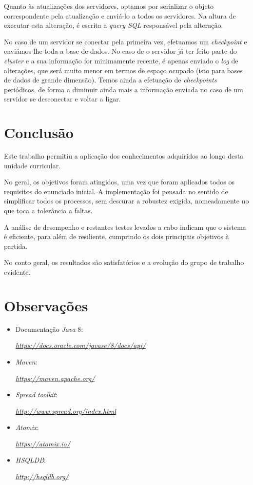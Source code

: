 \documentclass[a4paper]{report}
\begin{document}
{\begin{enumerate}
		Quanto às atualizações dos servidores, optamos por serializar o objeto correspondente pela atualização e enviá-lo a todos os servidores. Na altura de executar esta alteração, é escrita a \textit{query SQL} responsável pela alteração.
		
		No caso de um servidor se conectar pela primeira vez, efetuamos um \textit{checkpoint} e enviámos-lhe toda a base de dados. No caso de o servidor já ter feito parte do \textit{cluster} e a sua informação for minimamente recente, é apenas enviado o \textit{log} de alterações, que será muito menor em termos de espaço ocupado (isto para bases de dados de grande dimensão). Temos ainda a efetuação de \textit{checkpoints} periódicos, de forma a diminuir ainda mais a informação enviada no caso de um servidor se desconectar e voltar a ligar.
		
	\end{enumerate}
}

\chapter{Conclusão} \label{ch:Conclusion}
\large{
	Este trabalho permitiu a aplicação dos conhecimentos adquiridos ao longo desta unidade curricular.

	No geral, os objetivos foram atingidos, uma vez que foram aplicados todos os requisitos do enunciado inicial.
	A implementação foi pensada no sentido de simplificar todos os processos, sem descurar a robustez exigida, nomeadamente no que toca a tolerância a faltas.

	A análise de desempenho e restantes testes levados a cabo indicam que o sistema é eficiente, para além de resiliente, cumprindo os dois principais objetivos à partida.

	No conto geral, os resultados são satisfatórios e a evolução do grupo de trabalho evidente.
}

\appendix
\chapter{Observações} \label{ch:Observations}
\begin{itemize}
    \item Documentação \textit{Java} 8:
    \par \textit{\url{https://docs.oracle.com/javase/8/docs/api/}}
	\item \textit{Maven}:
	\par \textit{\url{https://maven.apache.org/}}
	\item \textit{Spread toolkit}:
	\par \textit{\url{http://www.spread.org/index.html}}
	\item \textit{Atomix}:
	\par \textit{\url{https://atomix.io/}}
	\item \textit{HSQLDB}:
	\par \textit{\url{http://hsqldb.org/}}
\end{itemize}
\end{document}
